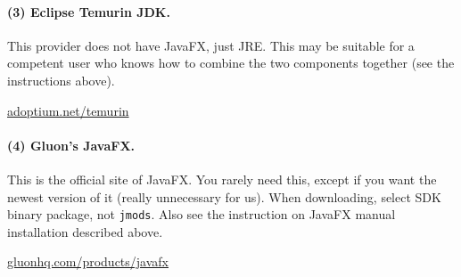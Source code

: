 \paragraph{(3) Eclipse Temurin JDK.} This provider does not have JavaFX, just JRE. This may be suitable for a competent user who knows how to combine the two components together (see the instructions above).

\begin{compactitem}
\item \url{adoptium.net/temurin}
\end{compactitem}

\paragraph{(4) Gluon's JavaFX.} This is the official site of JavaFX. You rarely need this, except if you want the newest version of it (really unnecessary for us). When downloading, select SDK binary package, not \texttt{jmods}. Also see the instruction on JavaFX manual installation described above.

\begin{compactitem}
\item \url{gluonhq.com/products/javafx}
\end{compactitem}



